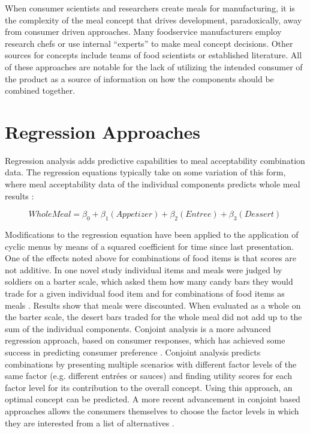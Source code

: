 When consumer scientists and researchers create meals for manufacturing, it is the complexity of the meal concept that drives development, paradoxically, away from consumer driven approaches.   Many foodservice manufacturers employ research chefs or use internal “experts” to make meal concept decisions.  Other sources for concepts include teams of food scientists or established literature.  All of these approaches are notable for the lack of utilizing the intended consumer of the product as a source of information on how the components should be combined together.  

\section{Regression Approaches}
Regression analysis adds predictive capabilities to meal acceptability combination data. The regression equations typically take on some variation of this form, where meal acceptability data of the individual components predicts whole meal results \citep{Hedderley1995,Moskowitz1983,Turner1988}:

\begin{equation}
Whole Meal = \beta _{0} + \beta _1(Appetizer) + \beta _2(Entree) + \beta _3(Dessert)\
\nonumber
\end{equation}

Modifications to the regression equation have been applied to the application of cyclic menus by means of a squared coefficient \citep{Moskowitz1983} for time since last presentation.
One of the effects noted above for combinations of food items is that scores are not additive.  In one novel study individual items and meals were judged by soldiers on a barter scale, which asked them how many candy bars they would trade for a given individual food item and for combinations of food items as meals \citep{Lawless1994}. Results show that meals were discounted. When evaluated as a whole on the barter scale, the desert bars traded for the whole meal did not add up to the sum of the individual components. 
Conjoint analysis is a more advanced regression approach, based on consumer responses, which has achieved some success in predicting consumer preference \citep{Green1978,Luce1964}.  Conjoint analysis predicts combinations by presenting multiple scenarios with different factor levels of the same factor (e.g. different entr\'{e}es or sauces) and finding utility scores for each factor level for its contribution to the overall concept.  Using this approach, an optimal concept can be predicted.  A more recent advancement in conjoint based approaches allows the consumers themselves to choose the factor levels in which they are interested from a list of alternatives \citep{Liechty2001}.

